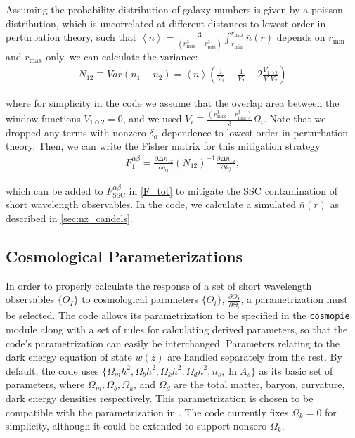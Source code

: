\documentclass[a4paper,11pt]{article}
\begin{document}
Assuming the probability distribution of galaxy numbers is given by a poisson distribution, which is uncorrelated at different distances to lowest order in perturbation theory, such that $\left<n\right>=\frac{3}{(r_\text{max}^3-r_\text{min}^3)}\int_{r_\text{min}}^{r_\text{max}}\bar{n}(r)$ depends on $r_\text{min}$ and $r_\text{max}$ only, we can calculate the variance:
\begin{align}\label{number_density_variance}
N_{12}\equiv Var\left(n_1-n_2\right) = \left<n\right>\left(\frac{1}{V_1}+\frac{1}{V_2}-2\frac{V_{1\cap 2}}{V_1 V_2}\right)
\end{align}

where for simplicity in the code we assume that the overlap area between the window functions $V_{1\cap 2}=0$, and we used $V_i \equiv \frac{(r_\text{max}^3-r_\text{min}^3)}{3}\Omega_i$. Note that we dropped any terms with nonzero $\delta_\alpha$ dependence to lowest order in perturbation theory. %
Then, we can write the Fisher matrix for this mitigation strategy
\begin{align}\label{lw_ssc}
F_1^{\alpha\beta}=\frac{\partial \Delta n_{12}}{\partial \delta_\alpha}(N_{12})^{-1}\frac{\partial \Delta n_{12}}{\partial \delta_\beta},
\end{align}

which can be added to $F_{\text{SSC}}^{\alpha\beta}$ in \eqref{F_tot} to mitigate the SSC contamination of short wavelength observables. In the code, we calculate a simulated $\bar{n}(r)$  as described in \ref{sec:nz_candels}.

\subsection{Cosmological Parameterizations}
\label{ssec:cosmo_param}
In order to properly calculate the response of a set of short wavelength observables $\{O_I\}$ to cosmological parameters $\{\Theta_i\}$, $\frac{\partial O_I}{\partial \Theta_i}$, a parametrization must be selected. The code allows its parametrization to be specified in the \texttt{cosmopie} module along with a set of rules for calculating derived parameters, so that the code's parametrization can easily be interchanged. Parameters relating to the dark energy equation of state $w(z)$ are handled separately from the rest. By default, the code uses $\{\Omega_m h^2,\Omega_b h^2,\Omega_k h^2, \Omega_d h^2, n_s,\ln{A_s}\}$ as its basic set of parameters, where $\Omega_m,\Omega_b,\Omega_k$, and $\Omega_d$ are the total matter, baryon, curvature, dark energy densities respectively. This parametrization is chosen to be compatible with the parametrization in \cite{jdem_fom}. The code currently fixes $\Omega_k=0$ for simplicity, although it could be extended to support nonzero $\Omega_k$. 
\end{document}
